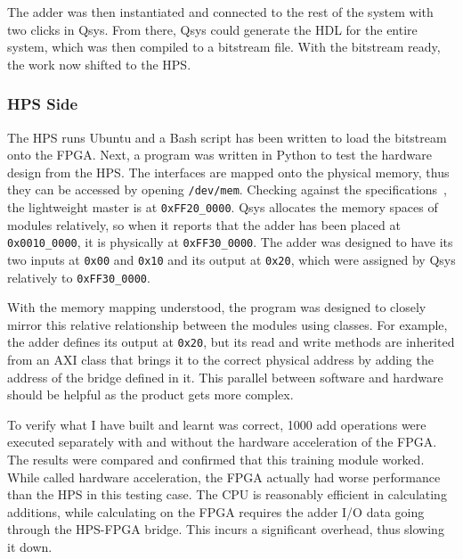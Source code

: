 The adder was then instantiated and connected to the rest of the system with
two clicks in Qsys.
From there, Qsys could generate the HDL for the entire system, which was then
compiled to a bitstream file.
With the bitstream ready, the work now shifted to the HPS.

\subsubsection{HPS Side}
The HPS runs Ubuntu and a Bash script has been written to load the bitstream
onto the FPGA.
Next, a program was written in Python to test the hardware design from the HPS.
The interfaces are mapped onto the physical memory, thus they can be accessed
by opening \texttt{/dev/mem}.
Checking against the specifications~\cite{Altera6}, the lightweight master is
at \texttt{0xFF20\_0000}.
Qsys allocates the memory spaces of modules relatively, so when it reports
that the adder has been placed at \texttt{0x0010\_0000}, it is physically at
\texttt{0xFF30\_0000}.
The adder was designed to have its two inputs at \texttt{0x00} and
\texttt{0x10} and its output at \texttt{0x20}, which were assigned by Qsys
relatively to \texttt{0xFF30\_0000}.

With the memory mapping understood, the program was designed to closely
mirror this relative relationship between the modules using classes.
For example, the adder defines its output at \texttt{0x20}, but its read and
write methods are inherited from an AXI class that brings it to the
correct physical address by adding the address of the bridge defined in it.
This parallel between software and hardware should be helpful as the product
gets more complex.

To verify what I have built and learnt was correct, 1000 add operations were
executed separately with and without the hardware acceleration of the FPGA.
The results were compared and confirmed that this training module worked.
While called hardware acceleration, the FPGA actually had worse performance
than the HPS in this testing case.
The CPU is reasonably efficient in calculating additions, while calculating
on the FPGA requires the adder I/O data going through the HPS-FPGA bridge.
This incurs a significant overhead, thus slowing it down.
